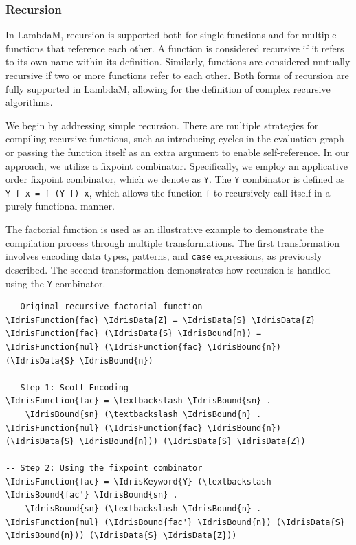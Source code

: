 \documentclass{IEEEtran}
\begin{document}
\subsubsection{Recursion}

\par In LambdaM, recursion is supported both for single functions and for multiple functions that reference each other. A function is considered recursive if it refers to its own name within its definition. Similarly, functions are considered mutually recursive if two or more functions refer to each other. Both forms of recursion are fully supported in LambdaM, allowing for the definition of complex recursive algorithms.

\par We begin by addressing simple recursion. There are multiple strategies for compiling recursive functions, such as introducing cycles in the evaluation graph or passing the function itself as an extra argument to enable self-reference. In our approach, we utilize a fixpoint combinator. Specifically, we employ an applicative order fixpoint combinator, which we denote as \verb!Y!. The \verb!Y! combinator is defined as \verb!Y f x = f (Y f) x!, which allows the function \texttt{f} to recursively call itself in a purely functional manner.

\par The factorial function is used as an illustrative example to demonstrate the compilation process through multiple transformations. The first transformation involves encoding data types, patterns, and \texttt{case} expressions, as previously described. The second transformation demonstrates how recursion is handled using the \texttt{Y} combinator.

\begin{Verbatim}
-- Original recursive factorial function
\IdrisFunction{fac} \IdrisData{Z} = \IdrisData{S} \IdrisData{Z}
\IdrisFunction{fac} (\IdrisData{S} \IdrisBound{n}) = \IdrisFunction{mul} (\IdrisFunction{fac} \IdrisBound{n}) (\IdrisData{S} \IdrisBound{n})

-- Step 1: Scott Encoding
\IdrisFunction{fac} = \textbackslash \IdrisBound{sn} .
    \IdrisBound{sn} (\textbackslash \IdrisBound{n} . \IdrisFunction{mul} (\IdrisFunction{fac} \IdrisBound{n}) (\IdrisData{S} \IdrisBound{n})) (\IdrisData{S} \IdrisData{Z})

-- Step 2: Using the fixpoint combinator
\IdrisFunction{fac} = \IdrisKeyword{Y} (\textbackslash \IdrisBound{fac'} \IdrisBound{sn} .
    \IdrisBound{sn} (\textbackslash \IdrisBound{n} . \IdrisFunction{mul} (\IdrisBound{fac'} \IdrisBound{n}) (\IdrisData{S} \IdrisBound{n})) (\IdrisData{S} \IdrisData{Z}))
\end{Verbatim}
\end{document}
